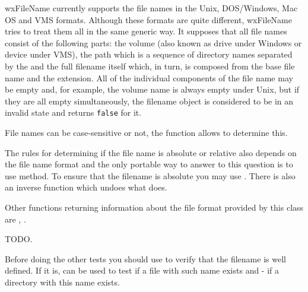 

\label{filenameformat}

wxFileName currently supports the file names in the Unix, DOS/Windows, Mac OS
and VMS formats. Although these formats are quite different, wxFileName tries
to treat them all in the same generic way. It supposes that all file names
consist of the following parts: the volume (also known as drive under Windows
or device under VMS), the path which is a sequence of directory names separated
by the  and the full
filename itself which, in turn, is composed from the base file name and the
extension. All of the individual components of the file name may be empty and,
for example, the volume name is always empty under Unix, but if they are all
empty simultaneously, the filename object is considered to be in an invalid
state and  returns {\tt false} for it.

File names can be case-sensitive or not, the function\rtfsp
{} allows to determine this.

The rules for determining if the file name is absolute or relative also depends
on the file name format and the only portable way to answer to this question is
to use  method. To ensure that the
filename is absolute you may use .
There is also an inverse function 
 which undoes what
 does.

Other functions returning information about the file format provided by this
class are ,\rtfsp
{}.



\label{filenameconstruction}

TODO.


\label{filetests}

Before doing the other tests you should use  to
verify that the filename is well defined. If it is, 
 can be used to test if a file with
such name exists and  - if a directory
with this name exists.

